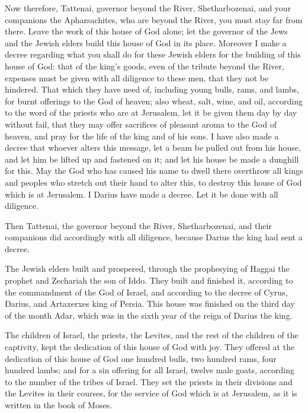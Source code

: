 \myverse{}Now therefore, Tattenai, governor beyond the River,
Shetharbozenai, and your companions the Apharsachites, who are beyond the River, you must stay far from
there.
\myverse{}Leave the work of this house of God alone; let the governor of the Jews and
the Jewish elders build this house of God in its place.
\myverse{}Moreover I make a decree regarding what you shall do for these Jewish elders
for the building of this house of God: that of the king’s goods, even of the tribute beyond the River,
expenses must be given with all diligence to these men, that they not be hindered.
\myverse{}That which they have need of, including young bulls, rams, and lambs, for burnt
offerings to the God of heaven; also wheat, salt, wine, and oil, according to the word of the priests
who are at Jerusalem, let it be given them day by day without fail,
\myverse{}that they may offer sacrifices of pleasant aroma to the God of heaven, and
pray for the life of the king and of his sons.
\myverse{}I have also made a decree that whoever alters this message, let a beam be
pulled out from his house, and let him be lifted up and fastened on it; and let his house be made a dunghill
for this.
\myverse{}May the God who has caused his name to dwell there overthrow all kings and
peoples who stretch out their hand to alter this, to destroy this house of God which is at Jerusalem.
I Darius have made a decree. Let it be done with all diligence.


\vspace{\baselineskip} \myverse{}Then Tattenai, the governor beyond the River, Shetharbozenai,
and their companions did accordingly with all diligence, because Darius the king had sent a decree.

\myverse{}The Jewish elders built and prospered, through the prophesying
of Haggai the prophet and Zechariah the son of Iddo. They built and finished it, according to the commandment
of the God of Israel, and according to the decree of Cyrus, Darius, and Artaxerxes king of Persia.
\myverse{}This house was finished on the third day of the month Adar, which was in the
sixth year of the reign of Darius the king.

\myverse{}The children of Israel, the priests, the Levites, and the rest
of the children of the captivity, kept the dedication of this house of God with joy.
\myverse{}They offered at the dedication of this house of God one hundred bulls, two
hundred rams, four hundred lambs; and for a sin offering for all Israel, twelve male goats, according
to the number of the tribes of Israel.
\myverse{}They set the priests in their divisions and the Levites in their courses,
for the service of God which is at Jerusalem, as it is written in the book of Moses.

